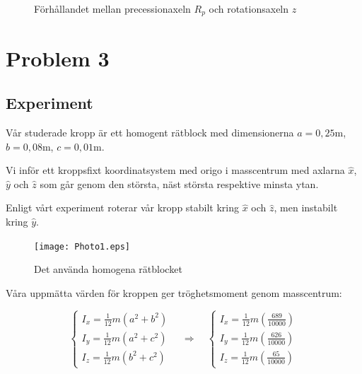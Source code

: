 \documentclass[12pt,a4paper]{article}
\begin{document}
	\begin{figure}
		\begin{center}
			
			\caption{Förhållandet mellan precessionaxeln $R_p$ och rotationsaxeln $z$}
                        \label{jorden}
		\end{center}
	\end{figure}
	
\section{Problem 3}
	
	
	\subsection{Experiment}
		
		Vår studerade kropp är ett homogent rätblock med dimensionerna
		$a = 0,25 \mathrm{m}$, $b = 0,08 \mathrm{m}$, $c = 0,01 \mathrm{m}$.
		
		Vi inför ett kroppsfixt koordinatsystem med origo i masscentrum med axlarna
		$\hat{x}$, $\hat{y}$ och $\hat{z}$ som går genom den största, näst
		största respektive minsta ytan.
		
		Enligt vårt experiment roterar vår kropp stabilt kring $\hat{x}$ och $\hat{z}$, men
		instabilt kring $\hat{y}$.
		
		\begin{figure}
			\begin{center}
				\texttt{[image: Photo1.eps]}
				\caption{Det använda homogena rätblocket}
			\end{center}
		\end{figure}
		
		Våra uppmätta värden för kroppen ger tröghetsmoment genom masscentrum:
		
		\begin{equation*}
			\begin{cases}
				I_x = \frac{1}{12} m (a^2 + b^2) \\
				I_y = \frac{1}{12} m (a^2 + c^2) \\
				I_z = \frac{1}{12} m (b^2 + c^2) 
			\end{cases}
			\hspace{12pt}
			\Rightarrow
			\hspace{12pt}
			\begin{cases}
				I_x = \frac{1}{12} m (\frac{689}{10000}) \\
				I_y = \frac{1}{12} m (\frac{626}{10000}) \\
				I_z = \frac{1}{12} m (\frac{65}{10000})
			\end{cases}
		\end{equation*}
		
\end{document}
